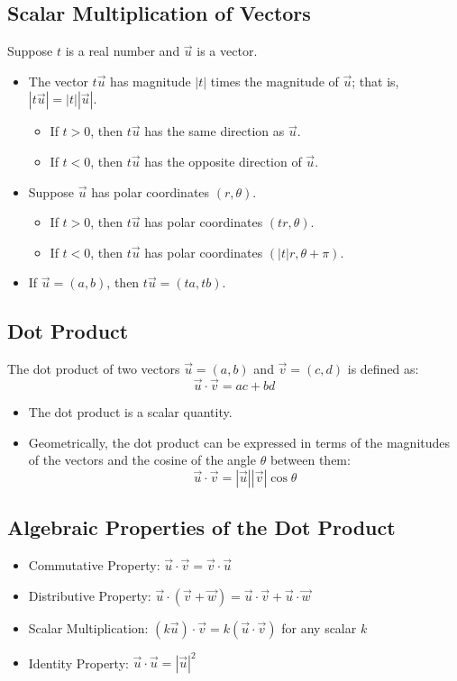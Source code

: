 \subsection{Scalar Multiplication of Vectors}
Suppose \(t\) is a real number and \(\vec{u}\) is a vector.
\begin{itemize}
    \item The vector \(t\vec{u}\) has magnitude \(|t|\) times the magnitude of \(\vec{u}\); that is, \(|t\vec{u}| = |t||\vec{u}|\).
    \begin{itemize}
        \item If \(t > 0\), then \(t\vec{u}\) has the same direction as \(\vec{u}\).
        \item If \(t < 0\), then \(t\vec{u}\) has the opposite direction of \(\vec{u}\).
    \end{itemize}
    \item Suppose \(\vec{u}\) has polar coordinates \((r, \theta)\).
    \begin{itemize}
        \item If \(t > 0\), then \(t\vec{u}\) has polar coordinates \((tr, \theta)\).
        \item If \(t < 0\), then \(t\vec{u}\) has polar coordinates \((|t|r, \theta + \pi)\).
    \end{itemize}
    \item If \(\vec{u} = (a, b)\), then \(t\vec{u} = (ta, tb)\).
\end{itemize}

\subsection{Dot Product}
The dot product of two vectors \(\vec{u} = (a, b)\) and \(\vec{v} = (c, d)\) is defined as:
\[ \vec{u} \cdot \vec{v} = ac + bd \]
\begin{itemize}
    \item The dot product is a scalar quantity.
    \item Geometrically, the dot product can be expressed in terms of the magnitudes of the vectors and the cosine of the angle \(\theta\) between them:
    \[ \vec{u} \cdot \vec{v} = |\vec{u}||\vec{v}|\cos\theta \]
\end{itemize}

\subsection{Algebraic Properties of the Dot Product}
\begin{itemize}
    \item Commutative Property: \(\vec{u} \cdot \vec{v} = \vec{v} \cdot \vec{u}\)
    \item Distributive Property: \(\vec{u} \cdot (\vec{v} + \vec{w}) = \vec{u} \cdot \vec{v} + \vec{u} \cdot \vec{w}\)
    \item Scalar Multiplication: \((k\vec{u}) \cdot \vec{v} = k(\vec{u} \cdot \vec{v})\) for any scalar \(k\)
    \item Identity Property: \(\vec{u} \cdot \vec{u} = |\vec{u}|^2\)
\end{itemize}

